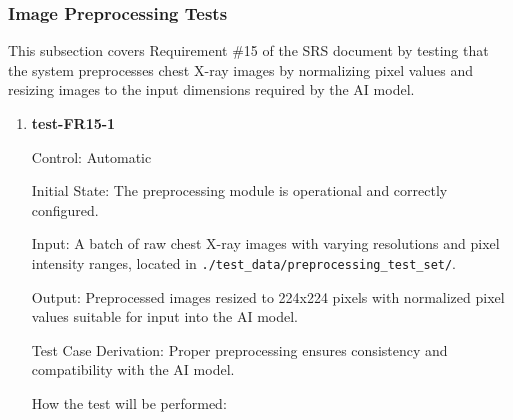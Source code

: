 \documentclass[12pt, titlepage]{article}
\begin{document}
\subsubsection{Image Preprocessing Tests}

This subsection covers Requirement \#15 of the SRS document by testing that the system preprocesses chest X-ray images by normalizing pixel values and resizing images to the input dimensions required by the AI model.

\begin{enumerate}

\item \textbf{test-FR15-1} \label{test-FR15-1}

Control: Automatic

Initial State: The preprocessing module is operational and correctly configured.

Input: A batch of raw chest X-ray images with varying resolutions and pixel intensity ranges, located in \texttt{./test\_data/preprocessing\_test\_set/}.

Output: Preprocessed images resized to 224x224 pixels with normalized pixel values suitable for input into the AI model.

Test Case Derivation: Proper preprocessing ensures consistency and compatibility with the AI model.

How the test will be performed:


\end{enumerate}
\end{document}
